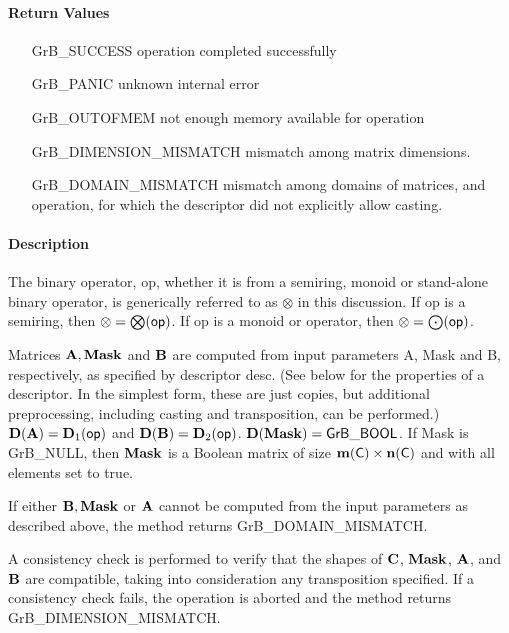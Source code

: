 \paragraph{Return Values}

\begin{itemize}[leftmargin=2.1in]
    \item[{\sf GrB\_SUCCESS}]             operation completed successfully
    \item[{\sf GrB\_PANIC}]               unknown internal error
    \item[{\sf GrB\_OUTOFMEM}]            not enough memory available for operation
    \item[{\sf GrB\_DIMENSION\_MISMATCH}] mismatch among matrix dimensions.
    \item[{\sf GrB\_DOMAIN\_MISMATCH}]    mismatch among domains of matrices, and operation, for which the descriptor did not explicitly allow casting.
\end{itemize}

\paragraph{Description}

The binary operator, {\sf op}, whether it is from a semiring, monoid or stand-alone binary operator,
is generically referred to as $\otimes$ in this discussion.
If {\sf op} is a semiring, then $\otimes = \bigotimes({\sf op})$. 
If {\sf op} is a monoid or operator, then $\otimes = \bigodot({\sf op})$.

Matrices ${\bf A}, {\bf Mask}$ and ${\bf B}$ are computed from
input parameters {\sf A}, {\sf Mask} and {\sf B}, respectively, as specified
by descriptor {\sf desc}. (See below for the properties of a descriptor. In
the simplest form, these are just copies, but additional preprocessing,
including casting and transposition, can be performed.)  $\bold{D}({\bf A}) =
\bold{D}_1({\sf op})$ and $\bold{D}({\bf B}) = \bold{D}_2({\sf op})$.
$\bold{D}({\bf Mask}) = {\sf GrB\_BOOL}$.  If {\sf Mask} is {\sf GrB\_NULL},
then ${\bf Mask}$ is a Boolean matrix of size $\bold{m}({\bf \sf C}) \times \bold{n}({\bf \sf C})$
and with all elements set to {\sf true}.

If either ${\bf B}, {\bf Mask}$ or ${\bf A}$ cannot be computed
from the input parameters as described above, the method returns {\sf
    GrB\_DOMAIN\_MISMATCH}.

A consistency check is performed to verify that the 
shapes of ${\bf C}$, ${\bf Mask}$, ${\bf A}$, and ${\bf B}$
are compatible, taking into consideration any transposition specified.
If a consistency
check fails, the operation is aborted and the method returns {\sf
    GrB\_DIMENSION\_MISMATCH}.

